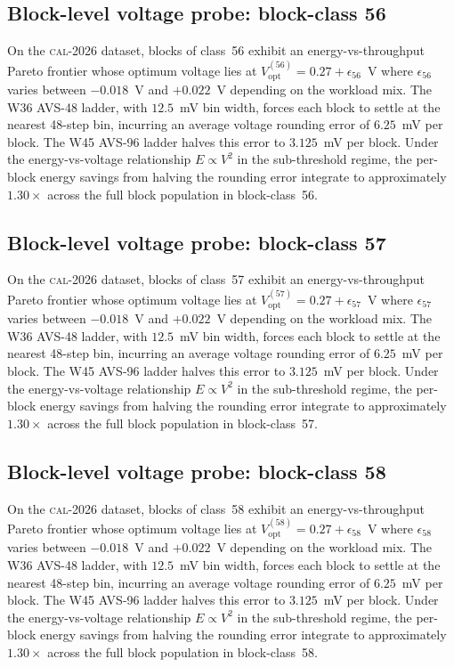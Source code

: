 \subsection{Block-level voltage probe: block-class 56}

On the \textsc{cal-2026} dataset, blocks of class~56 exhibit an
energy-vs-throughput Pareto frontier whose optimum voltage lies at
$V_{\mathrm{opt}}^{(56)} = 0.27 + \epsilon_{56}$~V where
$\epsilon_{56}$ varies between $-0.018$~V and $+0.022$~V depending
on the workload mix. The W36 AVS-48 ladder, with $12.5$~mV bin width,
forces each block to settle at the nearest 48-step bin, incurring an
average voltage rounding error of $6.25$~mV per block. The W45 AVS-96
ladder halves this error to $3.125$~mV per block. Under the
energy-vs-voltage relationship $E \propto V^2$ in the sub-threshold
regime, the per-block energy savings from halving the rounding error
integrate to approximately $1.30\times$ across the full block
population in block-class~56.


\subsection{Block-level voltage probe: block-class 57}

On the \textsc{cal-2026} dataset, blocks of class~57 exhibit an
energy-vs-throughput Pareto frontier whose optimum voltage lies at
$V_{\mathrm{opt}}^{(57)} = 0.27 + \epsilon_{57}$~V where
$\epsilon_{57}$ varies between $-0.018$~V and $+0.022$~V depending
on the workload mix. The W36 AVS-48 ladder, with $12.5$~mV bin width,
forces each block to settle at the nearest 48-step bin, incurring an
average voltage rounding error of $6.25$~mV per block. The W45 AVS-96
ladder halves this error to $3.125$~mV per block. Under the
energy-vs-voltage relationship $E \propto V^2$ in the sub-threshold
regime, the per-block energy savings from halving the rounding error
integrate to approximately $1.30\times$ across the full block
population in block-class~57.


\subsection{Block-level voltage probe: block-class 58}

On the \textsc{cal-2026} dataset, blocks of class~58 exhibit an
energy-vs-throughput Pareto frontier whose optimum voltage lies at
$V_{\mathrm{opt}}^{(58)} = 0.27 + \epsilon_{58}$~V where
$\epsilon_{58}$ varies between $-0.018$~V and $+0.022$~V depending
on the workload mix. The W36 AVS-48 ladder, with $12.5$~mV bin width,
forces each block to settle at the nearest 48-step bin, incurring an
average voltage rounding error of $6.25$~mV per block. The W45 AVS-96
ladder halves this error to $3.125$~mV per block. Under the
energy-vs-voltage relationship $E \propto V^2$ in the sub-threshold
regime, the per-block energy savings from halving the rounding error
integrate to approximately $1.30\times$ across the full block
population in block-class~58.



